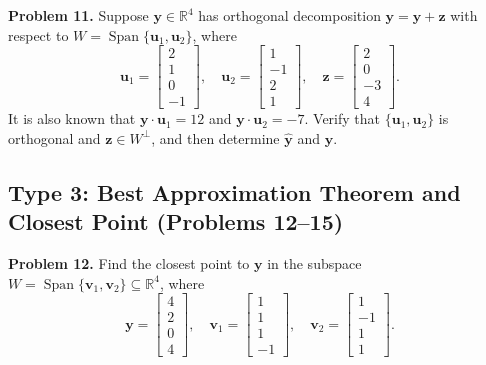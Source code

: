 \documentclass[11pt, letterpaper]{article}
\theoremstyle{definition}
\theoremstyle{remark}
\newcommand{\R}{\mathbb{R}}
\begin{document}
\textbf{Problem 11.} Suppose $\mathbf{y} \in \R^4$ has orthogonal decomposition $\mathbf{y} = \hat{\mathbf{y}} + \mathbf{z}$ with respect to $W = \operatorname{Span}\{\mathbf{u}_1, \mathbf{u}_2\}$, where
\[
\mathbf{u}_1 = \begin{bmatrix} 2 \\ 1 \\ 0 \\ -1 \end{bmatrix}, \quad \mathbf{u}_2 = \begin{bmatrix} 1 \\ -1 \\ 2 \\ 1 \end{bmatrix}, \quad \mathbf{z} = \begin{bmatrix} 2 \\ 0 \\ -3 \\ 4 \end{bmatrix}.
\]
It is also known that $\mathbf{y} \cdot \mathbf{u}_1 = 12$ and $\mathbf{y} \cdot \mathbf{u}_2 = -7$. Verify that $\{\mathbf{u}_1, \mathbf{u}_2\}$ is orthogonal and $\mathbf{z} \in W^\perp$, and then determine $\hat{\mathbf{y}}$ and $\mathbf{y}$.

\subsection{Type 3: Best Approximation Theorem and Closest Point (Problems 12--15)}

\textbf{Problem 12.} Find the closest point to $\mathbf{y}$ in the subspace $W = \operatorname{Span}\{\mathbf{v}_1, \mathbf{v}_2\} \subseteq \R^4$, where
\[
\mathbf{y} = \begin{bmatrix} 4 \\ 2 \\ 0 \\ 4 \end{bmatrix}, \quad \mathbf{v}_1 = \begin{bmatrix} 1 \\ 1 \\ 1 \\ -1 \end{bmatrix}, \quad \mathbf{v}_2 = \begin{bmatrix} 1 \\ -1 \\ 1 \\ 1 \end{bmatrix}.
\]
\end{document}
